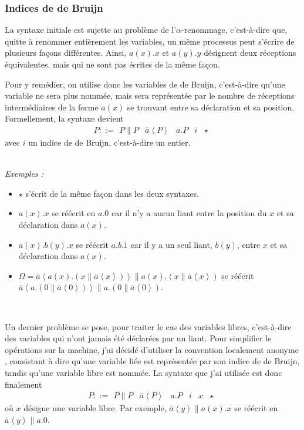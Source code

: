 \documentclass[11pt]{article}
\newcommand{\send}[2]{\bar{#1}\left\langle #2\right\rangle}
\begin{document}
\subsubsection{Indices de de Bruijn}
\label{sec-1-2}

La syntaxe initiale est sujette au problème de l'$\alpha$-renommage, c'est-à-dire que, quitte à renommer entièrement les variables, un même processus peut s'écrire de plusieurs façons différentes. Ainsi, $a(x).x$ et $a(y).y$ désignent deux réceptions équivalentes, mais qui ne sont pas écrites de la même façon.

Pour y remédier, on utilise donc les variables de de Bruijn, c'est-à-dire qu'une variable ne sera plus nommée, mais sera représentée par le nombre de réceptions intermédiaires de la forme $a(x)$ se trouvant entre sa déclaration et sa position.
Formellement, la syntaxe devient
\[P::=\begin{array}{c|c|c|c|c}P\parallel P & \send{a}P & a.P & i & \star\end{array}\]
avec $i$ un indice de de Bruijn, c'est-à-dire un entier.

\textsl{\\Exemples :}
\begin{itemize}
	\item $\star$ s'écrit de la même façon dans les deux syntaxes.
	\item $a(x).x$ se réécrit en $a.0$ car il n'y a aucun liant entre la position du $x$ et sa déclaration dans $a(x)$.
	\item $a(x).b(y).x$ se réécrit $a.b.1$ car il y a un seul liant, $b(y)$, entre $x$ et sa déclaration dans $a(x)$.
	\item $\Omega = \send{a}{a(x).(x\parallel \send{a}x)} \parallel a(x).(x\parallel \send{a}x)$ se réécrit
	$\send{a}{a.(0\parallel \send{a}0)} \parallel a.(0\parallel \send{a}0)$.
\end{itemize}

\textit{\\}

Un dernier problème se pose, pour traiter le cas des variables libres, c'est-à-dire des variables qui n'ont jamais été déclarées par un liant.
Pour simplifier le opérations sur la machine, j'ai décidé d'utiliser la convention localement anonyme \cite{Chargueraud12}, consistant à dire qu'une variable liée est représentée par son indice de de Bruijn, tandis qu'une variable libre est nommée.
La syntaxe que j'ai utilisée est donc finalement
\[P::=\begin{array}{c|c|c|c|c|c}P\parallel P & \send{a}P & a.P & i & x & \star\end{array}\]
où $x$ désigne une variable libre.
Par exemple, $\send{a}y\parallel a(x).x$ se réécrit en $\send{a}y \parallel a.0$.
\end{document}
